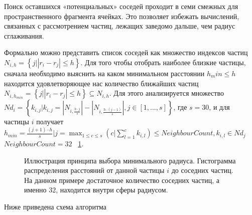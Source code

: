 Поиск оставшихся «потенциальных» соседей проходит в семи смежных для пространственного фрагмента ячейках. Это позволяет избежать вычислений, связанных с рассмотрением частиц, лежащих заведомо дальше, чем радиус сглаживания.

Формально можно представить список соседей как множество индексов частиц \(N_{i,h}=\left \{ j|\left | r_i-r_j \right | \leqslant h \right \}\). Для того чтобы отобрать наиболее близкие частицы, сначала необходимо выяснить на каком минимальном расстоянии \(h_min \leq  h\) находится удовлетворяющее нас количество ближайших частиц \(N_{i,h_{min}}=\left \{ j|\left | r_i-r_j \right | \leqslant h \right\} \subseteq N_{i,h}\). Для этого анализируется множество \(Nd_i=\left \{ k_{i,j}|k_{i,j}=\left | N_{i,\frac{h\cdot j}{s}} \right | - \left | N_{i,\frac{h\cdot (j-1)}{s}} \right |, j\in [1,...,s] \right \}\), где \(s=30\), и для частицы \(i\) получает \(h_{min}=\frac{(j+1)\cdot h}{s} |  j = \max_{1\leq c\leq s}\left ( c|\sum_{l=1}^{c} k_{i,l} \right )\leq NeighbourCount, k_{i,l} \in Nd_j\) \(NeighbourCount=32\) ~\ref{fig:ns_5}.
\begin{figure}[ht]
  \centerfloat{
    \texttt{[image: ns\_5]}
  }
  \caption{Иллюстрация принципа выбора минимального радиуса. Гистограмма распределения расстояний от данной частицы \(i\) до соседних частиц. На данном примере достаточное количество соседних частиц, а именно 32, находится внутри сферы радиусом.}
  \label{fig:ns_5}
\end{figure}
Ниже приведена схема алгоритма
